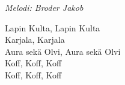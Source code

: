 {\footnotesize\textit{Melodi: Broder Jakob}}\par
\vspace{10pt}
Lapin Kulta, Lapin Kulta\\
Karjala, Karjala\\
Aura sekä Olvi, Aura sekä Olvi\\
Koff, Koff, Koff\\
Koff, Koff, Koff

